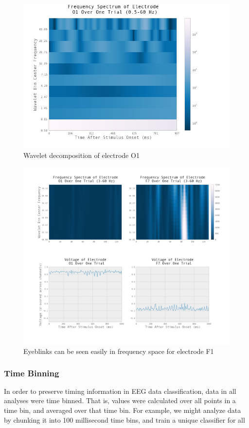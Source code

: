 \documentclass[11pt]{report}
\begin{document}
\begin{figure}[t]
\centering
\includegraphics[width=6in]{wavelet_transform_O1_halfto60}
\caption{Wavelet decomposition of electrode O1\label{wavelet_decomp}}
\end{figure}

\begin{figure}[t]
\centering
\includegraphics[width=5.5in]{eyebink_wavelets_compare}
\caption{Eyeblinks can be seen easily in frequency space for electrode F1}
\end{figure}

\subsubsection{Time Binning}
	In order to preserve timing information in EEG data classification, data in all analyses were time binned.  That is, values were calculated over all points in a time bin, and averaged over that time bin.  For example, we might analyze data by chunking it into 100 millisecond time bins, and train a unique classifier for all 
\end{document}
